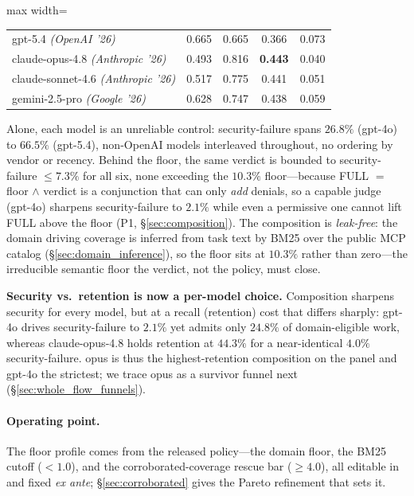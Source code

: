 \documentclass[sigconf,review,anonymous]{acmart}
\begin{document}
\begin{table}[!t]
\begin{adjustbox}{max width=\columnwidth}
\begin{tabular}{@{}lcccc@{}}
gpt-5.4 \textit{(OpenAI '26)}              & 0.665 & 0.665 & 0.366 & 0.073 \\
\addlinespace[2pt]
claude-opus-4.8 \textit{(Anthropic '26)}   & 0.493 & 0.816 & \textbf{0.443} & 0.040 \\
claude-sonnet-4.6 \textit{(Anthropic '26)} & 0.517 & 0.775 & 0.441 & 0.051 \\
gemini-2.5-pro \textit{(Google '26)}       & 0.628 & 0.747 & 0.438 & 0.059 \\
\bottomrule
\end{tabular}
\end{adjustbox}
\end{table}

Alone, each model is an unreliable control: security-failure spans $26.8\%$ (gpt-4o) to $66.5\%$ (gpt-5.4), non-OpenAI models interleaved throughout, no ordering by vendor or recency. Behind the floor, the same verdict is bounded to security-failure $\leq7.3\%$ for all six, none exceeding the $10.3\%$ floor---because FULL $=$ floor $\wedge$ verdict is a conjunction that can only \emph{add} denials, so a capable judge (gpt-4o) sharpens security-failure to $2.1\%$ while even a permissive one cannot lift FULL above the floor (P1, \S\ref{sec:composition}). The composition is \emph{leak-free}: the domain driving coverage is inferred from task text by BM25 over the public MCP catalog (\S\ref{sec:domain_inference}), so the floor sits at $10.3\%$ rather than zero---the irreducible semantic floor the verdict, not the policy, must close.

\textbf{Security vs.\ retention is now a per-model choice.} Composition sharpens security for every model, but at a recall (retention) cost that differs sharply: gpt-4o drives security-failure to $2.1\%$ yet admits only $24.8\%$ of domain-eligible work, whereas claude-opus-4.8 holds retention at $44.3\%$ for a near-identical $4.0\%$ security-failure. opus is thus the highest-retention composition on the panel and gpt-4o the strictest; we trace opus as a survivor funnel next (\S\ref{sec:whole_flow_funnels}).

\paragraph{Operating point.} The floor profile comes from the released policy---the  domain floor, the  BM25 cutoff ($<\!1.0$), and the corroborated-coverage rescue bar ($\geq\!4.0$), all editable in  and fixed \emph{ex ante}; \S\ref{sec:corroborated} gives the Pareto refinement that sets it.
\end{document}

